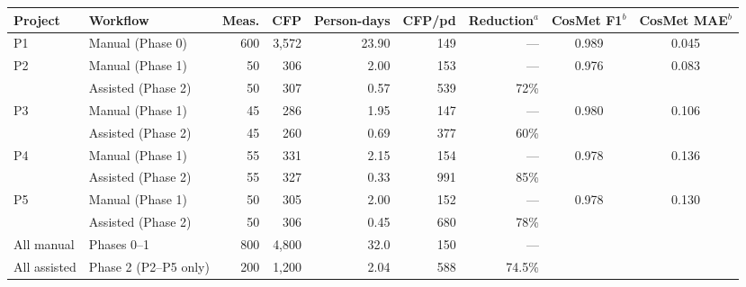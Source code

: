 \begin{tabular}{@{}llrrrrrcc@{}}
\toprule
Project & Workflow & Meas. & CFP & Person-days & CFP/pd & Reduction$^{a}$ & CosMet F1$^{b}$ & CosMet MAE$^{b}$ \\
\midrule
P1 & Manual (Phase 0) & 600 & 3,572 & 23.90 & 149 & --- & 0.989 & 0.045 \\
\addlinespace[2pt]
P2 & Manual (Phase 1) & 50 & 306 & 2.00 & 153 & --- & 0.976 & 0.083 \\
 & Assisted (Phase 2) & 50 & 307 & 0.57 & 539 & 72\% & & \\
\addlinespace[2pt]
P3 & Manual (Phase 1) & 45 & 286 & 1.95 & 147 & --- & 0.980 & 0.106 \\
 & Assisted (Phase 2) & 45 & 260 & 0.69 & 377 & 60\% & & \\
\addlinespace[2pt]
P4 & Manual (Phase 1) & 55 & 331 & 2.15 & 154 & --- & 0.978 & 0.136 \\
 & Assisted (Phase 2) & 55 & 327 & 0.33 & 991 & 85\% & & \\
\addlinespace[2pt]
P5 & Manual (Phase 1) & 50 & 305 & 2.00 & 152 & --- & 0.978 & 0.130 \\
 & Assisted (Phase 2) & 50 & 306 & 0.45 & 680 & 78\% & & \\
\addlinespace[2pt]
\midrule
All manual & Phases 0--1 & 800 & 4,800 & 32.0 & 150 & --- & & \\
All assisted & Phase 2 (P2--P5 only) & 200 & 1,200 & 2.04 & 588 & 74.5\% & & \\
\bottomrule
\end{tabular}

